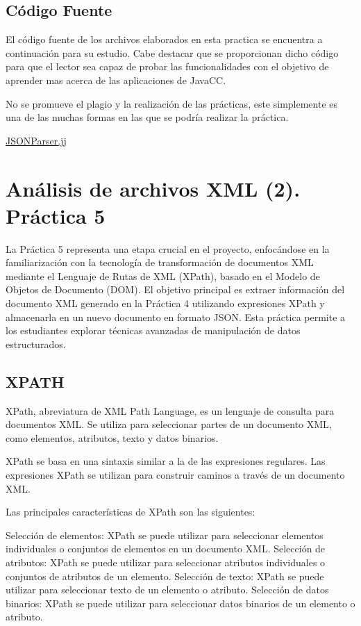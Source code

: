 \subsection{Código Fuente}

\noindent El código fuente de los archivos elaborados en esta practica se encuentra a continuación para su estudio. Cabe destacar que se proporcionan dicho código para que el lector sea capaz de probar las funcionalidades con el objetivo de aprender mas acerca de las aplicaciones de JavaCC.

No se promueve el plagio y la realización de las prácticas, este simplemente es una de las muchas formas en las que se podría realizar la práctica.

\hyperref[sec:JSONParser]{JSONParser.jj}

\section{Análisis de archivos XML (2). Práctica 5}

La Práctica 5 representa una etapa crucial en el proyecto, enfocándose en la familiarización con la tecnología de transformación de documentos XML mediante el Lenguaje de Rutas de XML (XPath), basado en el Modelo de Objetos de Documento (DOM). El objetivo principal es extraer información del documento XML generado en la Práctica 4 utilizando expresiones XPath y almacenarla en un nuevo documento en formato JSON. Esta práctica permite a los estudiantes explorar técnicas avanzadas de manipulación de datos estructurados.

\subsection{XPATH}

XPath, abreviatura de XML Path Language, es un lenguaje de consulta para documentos XML. Se utiliza para seleccionar partes de un documento XML, como elementos, atributos, texto y datos binarios.

XPath se basa en una sintaxis similar a la de las expresiones regulares. Las expresiones XPath se utilizan para construir caminos a través de un documento XML.

Las principales características de XPath son las siguientes:

Selección de elementos: XPath se puede utilizar para seleccionar elementos individuales o conjuntos de elementos en un documento XML.
Selección de atributos: XPath se puede utilizar para seleccionar atributos individuales o conjuntos de atributos de un elemento.
Selección de texto: XPath se puede utilizar para seleccionar texto de un elemento o atributo.
Selección de datos binarios: XPath se puede utilizar para seleccionar datos binarios de un elemento o atributo.

